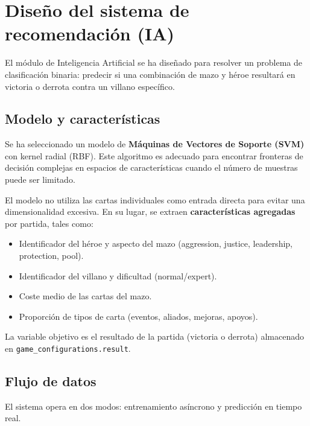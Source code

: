 \section{Diseño del sistema de recomendación (IA)}

El módulo de Inteligencia Artificial se ha diseñado para resolver un problema de clasificación binaria: predecir si una combinación de mazo y héroe resultará en victoria o derrota contra un villano específico.

\subsection{Modelo y características}

Se ha seleccionado un modelo de \textbf{Máquinas de Vectores de Soporte (SVM)} con kernel radial (RBF). Este algoritmo es adecuado para encontrar fronteras de decisión complejas en espacios de características cuando el número de muestras puede ser limitado.

El modelo no utiliza las cartas individuales como entrada directa para evitar una dimensionalidad excesiva. En su lugar, se extraen \textbf{características agregadas} por partida, tales como:
\begin{itemize}
    \item Identificador del héroe y aspecto del mazo (aggression, justice, leadership, protection, pool).
    \item Identificador del villano y dificultad (normal/expert).
    \item Coste medio de las cartas del mazo.
    \item Proporción de tipos de carta (eventos, aliados, mejoras, apoyos).
\end{itemize}
La variable objetivo es el resultado de la partida (victoria o derrota) almacenado en \texttt{game\_configurations.result}.

\subsection{Flujo de datos}

El sistema opera en dos modos: entrenamiento asíncrono y predicción en tiempo real.

